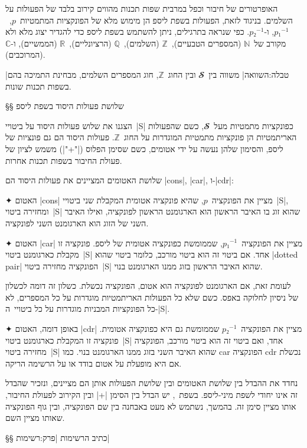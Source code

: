 האופרטורים של חיבור וכפל במרבית שפות תכנות מהווים קירוב בלבד של הפעולות על
השלמים. בניגוד לזאת, הפעולות בשפת ליספ הן מימוש מלא של הפונקציות
המתמטיות~$p$,~$p₁^{-1}$, ו-$p₂^{-1}$. כפי שנראה בתרגילים, ניתן להשתמש בשפת
ליספ כדי להגדיר יצוג מלא ולא מקורב של~$ℕ$ (המספרים הטבעיים),~$ℤ$ (השלמים),~$ℚ$
(הרציונליים),~$ℝ$ (הממשיים), ו-$ℂ$ (המרוכבים).

|טבלה:השוואה| משווה בין~$𝓢$ ובין החוג~$ℤ$, חוג המספרים השלמים,
מבחינת התמיכה בהם בשפות תכנות שונות.

§§ שלושת פעולות היסוד בשפת ליספ

הצגנו את שלוש פעולות היסוד על ביטויי~\E|S| כפונקציות מתמטיות מעל~$𝓢$, כשם
שהפעולות האריתמטיות הן פונקציות מתמטיות המוגדרות על החוג~$ℤ$. פעולות היסוד הם
גם פונציות של ליספ, והסימון שלהן נעשה על ידי אטומים, כשם שסימן הפלוס
(\T|"+"|) משמש לציון של פעולת החיבור בשפות תכנות אחרות.

שלושת האטומים המציינים את פעולות היסוד הם \T|cons|, \T|car|, ו-\T|cdr|:
\begin{enumerate}
  ✦ האטום \T|cons| מציין את הפונקציה~$p$, שהיא פונקציה אטומית המקבלת שני
  ביטויי~\E|S|, ומחזירה ביטוי~\E|S| שהוא זוג בו האיבר הראשון הוא הארגומנט
  הראשון לפונקציה, ואילו האיבר השני של הזוג הוא הארגומנט השני לפונקציה.

  ✦ האטום \T|car| מציין את הפונקציה~$p₁^{-1}$, שממומשת כפונקציה אטומית של
  ליספ. פונקציה זו מקבלת כארגומנט ביטוי~\E|S| אחד. אם ביטוי זה הוא ביטוי מורכב,
  כלומר ביטוי שהוא \E|dotted pair| הפונקציה מחזירה ביטוי~\E|S| שהוא האיבר
  הראשון בזוג ממנו הארגומנט בנוי.

  לעומת זאת, אם הארגומנט לפונקציה הוא אטום, הפונקציה נכשלת. כשלון זה דומה
  לכשלון של ניסיון לחלוקה באפס. כשם שלא כל הפעולות האריתמטיות מוגדרות על כל
  המספרים, לא כל הפונקציות המבניות מוגדרות על כל ביטויי~ה-\E|S|.

  ✦ באופן דומה, האטום \T|cdr| מציין את הפונקציה~$p₂^{-1}$ שממומשת גם היא
  כפונקציה אטומית. פונקציה זו המקבלת כארגומנט ביטוי~\E|S| אחד, ואם ביטוי זה
  הוא ביטוי מורכב, הפונקציה מחזירה ביטוי~\E|S| שהוא האיבר השני בזוג ממנו
  הארגומנט בנוי. כמו car הפונקציה cdr נכשלת אם היא מופעלת על אטום בודד
  או על הרשימה הריקה.
\end{enumerate}

נחדד את ההבדל בין שלושת האטומים ובין שלושת הפעולות אותן הם מציינים, ונזכיר
שהבדל זה אינו יחודי לשפת מיני-ליספ. בשפת~\CPL, יש הבדל בין הסימן \T|+| ובין
הקירוב לפעולת החיבור, אותו מציין סימן זה. בהמשך, נשתמש לא מעט באבחנה בין שם
הפונקציה, ובין גוף הפונקציה שאותו מציין השם.

§§ כתיב הרשימות
|פרק:רשימות|

